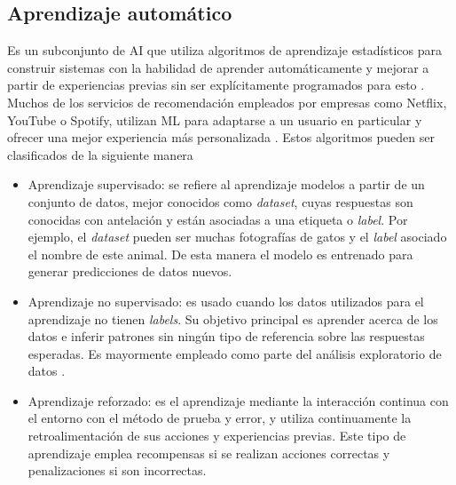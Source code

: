 \subsection{Aprendizaje automático}
Es un subconjunto de AI que utiliza algoritmos de aprendizaje estadísticos para construir sistemas con la habilidad de aprender automáticamente y mejorar a partir de experiencias previas sin ser explícitamente programados para esto \cite{ml_def}. Muchos de los servicios de recomendación empleados por empresas como Netflix, YouTube o Spotify, utilizan ML para adaptarse a un usuario en particular y ofrecer una mejor experiencia más personalizada \cite{ml_apps}. Estos algoritmos pueden ser clasificados de la siguiente manera \cite{ml_types}
\begin{itemize}
	\item Aprendizaje supervisado: se refiere al aprendizaje modelos a partir de un conjunto de datos, mejor conocidos como \textit{dataset}, cuyas respuestas son conocidas con antelación y están asociadas a una etiqueta o \textit{label}. Por ejemplo, el \textit{dataset} pueden ser muchas fotografías de gatos y el \textit{label} asociado el nombre de este animal. De esta manera el modelo es entrenado para generar predicciones de datos nuevos.
	
	\item Aprendizaje no supervisado: es usado cuando los datos utilizados para el aprendizaje no tienen \textit{labels}. Su objetivo principal es aprender acerca de los datos e inferir patrones sin ningún tipo de referencia sobre las respuestas esperadas. Es mayormente empleado como parte del análisis exploratorio de datos \cite{ai_ml_dl}.
	
	\item Aprendizaje reforzado: es el aprendizaje mediante la interacción continua con el entorno con el método de prueba y error, y utiliza continuamente la retroalimentación de sus acciones y experiencias previas. Este tipo de aprendizaje emplea recompensas si se realizan acciones correctas y penalizaciones si son incorrectas.
\end{itemize}

